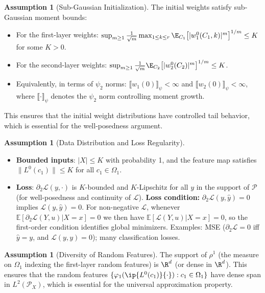 \documentclass[nohyperref]{article}
\theoremstyle{plain}
\theoremstyle{definition}
\newtheorem{assumption}[theorem]{Assumption}
\theoremstyle{remark}
\begin{document}
\begin{assumption}[Sub-Gaussian Initialization]
\label{assump:init}
The initial weights satisfy sub-Gaussian moment bounds:
\begin{itemize}
\item For the first-layer weights: $\sup_{m\ge 1}\frac{1}{\sqrt{m}}\max_{1\le k\le r}\E_{C_1}\!\left[|w_1^0(C_1,k)|^m\right]^{1/m}\le K$ for some $K>0$.
\item For the second-layer weights: $\sup_{m\ge 1}\frac{1}{\sqrt{m}}\E_{C_2}\!\left[|w_2^0(C_2)|^m\right]^{1/m}\le K$.
\item Equivalently, in terms of $\psi_2$ norms: $\llbracket w_1(0)\rrbracket_{\psi}<\infty$ and $\llbracket w_2(0)\rrbracket_{\psi}<\infty$, where $\llbracket\cdot\rrbracket_{\psi}$ denotes the $\psi_2$ norm controlling moment growth.
\end{itemize}
This ensures that the initial weight distributions have controlled tail behavior, which is essential for the well-posedness argument.
\end{assumption}

\begin{assumption}[Data Distribution and Loss Regularity]
\label{assump:data}
\begin{itemize}
\item \textbf{Bounded inputs}: $|X|\le K$ with probability 1, and the feature map satisfies $\|L^0(c_1)\|\le K$ for all $c_1\in\Omega_1$.
\item \textbf{Loss}: $\partial_2\mathcal{L}(y,\cdot)$ is $K$-bounded and $K$-Lipschitz for all $y$ in the support of $\mathcal{P}$ (for well-posedness and continuity of $\mathscr{L}$). \textbf{Loss condition:} $\partial_2\mathcal{L}(y,\hat{y})=0$ implies $\mathcal{L}(y,\hat{y})=0$. For non-negative $\mathcal{L}$, whenever $\mathbb{E}[\partial_2\mathcal{L}(Y,u)|X=x]=0$ we then have $\mathbb{E}[\mathcal{L}(Y,u)|X=x]=0$, so the first-order condition identifies global minimizers. Examples: MSE ($\partial_2\mathcal{L}=0$ iff $\hat{y}=y$, and $\mathcal{L}(y,y)=0$); many classification losses.
\end{itemize}
\end{assumption}

\begin{assumption}[Diversity of Random Features]
\label{assump:diversity}
The support of $\rho^1$ (the measure on $\Omega_1$ indexing the first-layer random features) is $\R^d$ (or dense in $\R^d$). This ensures that the random features $\{\varphi_1(\ip{L^0(c_1)}{\cdot}): c_1\in\Omega_1\}$ have dense span in $L^2(\mathcal{P}_X)$, which is essential for the universal approximation property.
\end{assumption}
\end{document}
